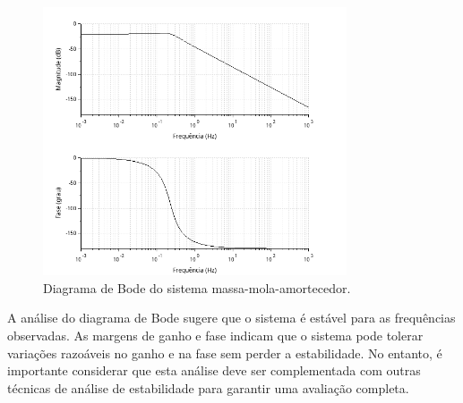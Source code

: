 \begin{figure}[h]
    \centering
    \includegraphics[width=0.8\textwidth]{atividades/8-atividade/assets/bode.png}
    \caption{Diagrama de Bode do sistema massa-mola-amortecedor.}
    \label{fig:Bode}
\end{figure}

A análise do diagrama de Bode sugere que o sistema é estável para as frequências observadas. As margens de ganho e fase indicam que o sistema pode tolerar variações razoáveis no ganho e na fase sem perder a estabilidade. No entanto, é importante considerar que esta análise deve ser complementada com outras técnicas de análise de estabilidade para garantir uma avaliação completa.
